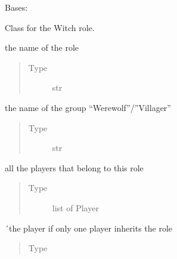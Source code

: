 \documentclass[letterpaper,10pt,english]{sphinxmanual}
\begin{document}
\begin{fulllineitems}
Bases: 

Class for the Witch role.


\begin{fulllineitems}
the name of the role
\begin{quote}\begin{description}
\item[{Type}] \leavevmode
str

\end{description}\end{quote}

\end{fulllineitems}



\begin{fulllineitems}
the name of the group “Werewolf”/”Villager”
\begin{quote}\begin{description}
\item[{Type}] \leavevmode
str

\end{description}\end{quote}

\end{fulllineitems}



\begin{fulllineitems}
all the players that belong to this role
\begin{quote}\begin{description}
\item[{Type}] \leavevmode
list of Player

\end{description}\end{quote}

\end{fulllineitems}



\begin{fulllineitems}
´the player if only one player inherits the role
\begin{quote}\begin{description}
\item[{Type}] \leavevmode
{\hyperref[\detokenize{chatwolf:chatwolf.player.Player}]{}}


\end{description}
\end{quote}
\end{fulllineitems}
\end{fulllineitems}
\end{document}
